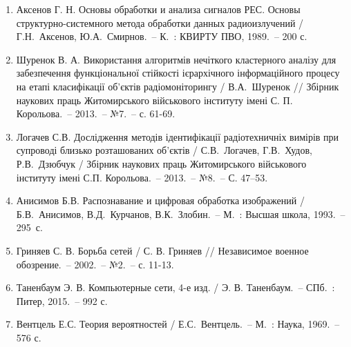 \begin{multicols}{2}
\begin{enumerate}
	\item Аксенов Г. Н. Основы обработки и анализа сигналов РЕС. Основы структурно-системного метода обработки данных радиоизлучений / Г.Н.~Аксенов,  Ю.А.~Смирнов.~--  К.~: КВИРТУ ПВО, 1989.~-- 200 с.
	\item Шуренок В. А. Використання алгоритмів нечіткого кластерного аналізу для забезпечення функціональної стійкості ієрархічного інформаційного процесу на етапі класифікації об’єктів радіомоніторингу / В.А.~Шуренок // Збірник наукових праць Житомирського військового інституту імені С. П. Корольова.~-- 2013.~-- №7.~-- с. 61-69.
	\item Логачев С.В. Дослідження методів ідентифікації радіотехничніх вимірів при супроводі близько розташованих об’єктів / С.В.~Логачев, Г.В.~Худов, Р.В.~Дзюбчук  / Збірник наукових праць Житомирського військового інституту імені С.П. Корольова.~-- 2013.~-- №8.~-- С. 47--53.  
	\item Анисимов Б.В. Распознавание и цифровая обработка изображений  / Б.В.~Анисимов, В.Д.~Курчанов, В.К.~Злобин.~-- М.~: Высшая школа, 1993.~-- 295~с. 
	\item Гриняев С. В.  Борьба сетей /  С. В. Гриняев // Независимое военное обозрение.~-- 2002.~-- №2.~-- с. 11-13.
	\item Таненбаум Э. В. Компьютерные сети, 4-е изд. / Э. В. Таненбаум.~-- СПб.~: Питер, 2015.~-- 992 с.
	\item Вентцель Е.С. Теория вероятностей  /  Е.С.~Вентцель.~-- М.~: Наука, 1969.~-- 576 с.
\end{enumerate}

\renewcommand{\refname}{References}

\begin{thebibliography}{9}\footnotesize


\end{thebibliography}
\end{multicols}
